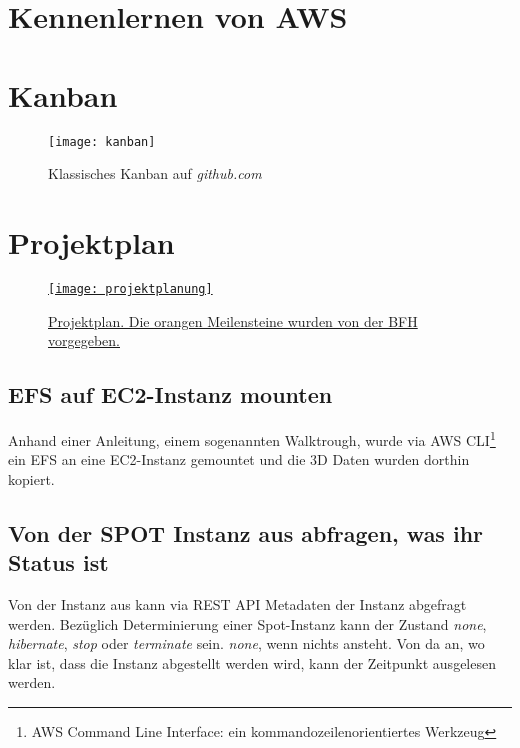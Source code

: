 \section{Kennenlernen von AWS}
\section{Kanban}\label{appendix:kanban}
\begin{figure}[H]
	\centering
	\texttt{[image: kanban]}
	\caption{Klassisches Kanban auf \emph{github.com}}
	\label{fig:Klassisches Kanban}
\end{figure}

\section{Projektplan}\label{appendix:projektplan}
\begin{figure}[H]
	\centering
	\href{https://docs.google.com/spreadsheets/d/1zKTZgt4BW736G0xRfU9o3vWYwAJj-8nzFvGsPR7yJ_0/edit?usp=sharing}{
	\texttt{[image: projektplanung]}}
	\caption{\href{https://docs.google.com/spreadsheets/d/1zKTZgt4BW736G0xRfU9o3vWYwAJj-8nzFvGsPR7yJ_0/edit?usp=sharing}{Projektplan. Die orangen Meilensteine wurden von der BFH vorgegeben.}}
	\label{fig:Projektplan}
\end{figure}

\subsection{EFS auf EC2-Instanz mounten}
Anhand einer Anleitung, einem sogenannten Walktrough, wurde via AWS CLI\footnote{AWS Command Line Interface: ein kommandozeilenorientiertes Werkzeug} ein
EFS an eine EC2-Instanz gemountet und die 3D Daten wurden dorthin kopiert.

\subsection{Von der SPOT Instanz aus abfragen, was ihr Status ist}
Von der Instanz aus kann via REST API Metadaten der Instanz abgefragt werden. Bezüglich Determinierung einer Spot-Instanz kann der Zustand \emph{none}, \emph{hibernate}, \emph{stop} oder \emph{terminate} sein. \emph{none}, wenn nichts ansteht. Von da an, wo klar ist, dass die Instanz abgestellt werden wird, kann der Zeitpunkt ausgelesen werden.

